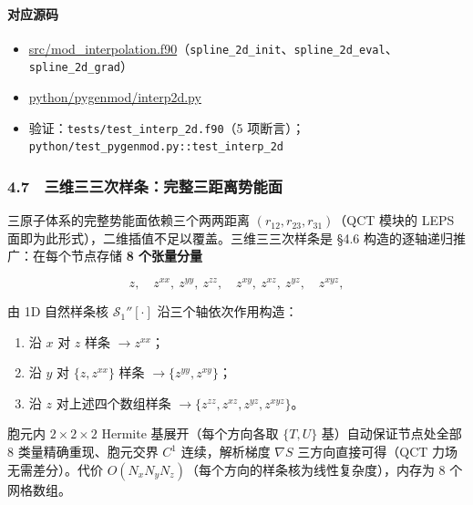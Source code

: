 \documentclass[
]{ctexbook}
\providecommand{\tightlist}{%
  \setlength{\itemsep}{0pt}\setlength{\parskip}{0pt}}
\begin{document}
\hypertarget{ux5bf9ux5e94ux6e90ux7801-1}{%
\paragraph{对应源码}\label{ux5bf9ux5e94ux6e90ux7801-1}}

\begin{itemize}
\tightlist
\item
  \href{https://github.com/l1Ha/QuantumGeneralModule/blob/main/src/mod_interpolation.f90}{src/mod\_interpolation.f90}（\texttt{spline\_2d\_init}、\texttt{spline\_2d\_eval}、\texttt{spline\_2d\_grad}）
\item
  \href{https://github.com/l1Ha/QuantumGeneralModule/blob/main/python/pygenmod/interp2d.py}{python/pygenmod/interp2d.py}
\item
  验证：\texttt{tests/test\_interp\_2d.f90}（5
  项断言）；\texttt{python/test\_pygenmod.py::test\_interp\_2d}
\end{itemize}

\hypertarget{ux4e09ux7ef4ux4e09ux4e09ux6b21ux6837ux6761ux5b8cux6574ux4e09ux8dddux79bbux52bfux80fdux9762}{%
\subsubsection{4.7　三维三三次样条：完整三距离势能面}\label{ux4e09ux7ef4ux4e09ux4e09ux6b21ux6837ux6761ux5b8cux6574ux4e09ux8dddux79bbux52bfux80fdux9762}}

三原子体系的完整势能面依赖三个两两距离 \((r_{12}, r_{23}, r_{31})\)（QCT
模块的 LEPS 面即为此形式），二维插值不足以覆盖。三维三三次样条是 §4.6
构造的逐轴递归推广：在每个节点存储 \textbf{8 个张量分量}

\[
z,\quad z^{xx},\ z^{yy},\ z^{zz},\quad z^{xy},\ z^{xz},\ z^{yz},\quad z^{xyz},
\]

由 1D 自然样条核 \(\mathcal{S}_1''[\cdot]\) 沿三个轴依次作用构造：

\begin{enumerate}
\def\labelenumi{\arabic{enumi}.}
\tightlist
\item
  沿 \(x\) 对 \(z\) 样条 \(\to z^{xx}\)；
\item
  沿 \(y\) 对 \(\{z, z^{xx}\}\) 样条 \(\to \{z^{yy}, z^{xy}\}\)；
\item
  沿 \(z\) 对上述四个数组样条
  \(\to \{z^{zz}, z^{xz}, z^{yz}, z^{xyz}\}\)。
\end{enumerate}

胞元内 \(2\times2\times2\) Hermite 基展开（每个方向各取 \(\{T,U\}\)
基）自动保证节点处全部 8 类量精确重现、胞元交界 \(C^1\) 连续，解析梯度
\(\nabla S\) 三方向直接可得（QCT 力场无需差分）。代价
\(O(N_xN_yN_z)\)（每个方向的样条核为线性复杂度），内存为 8 个网格数组。
\end{document}
